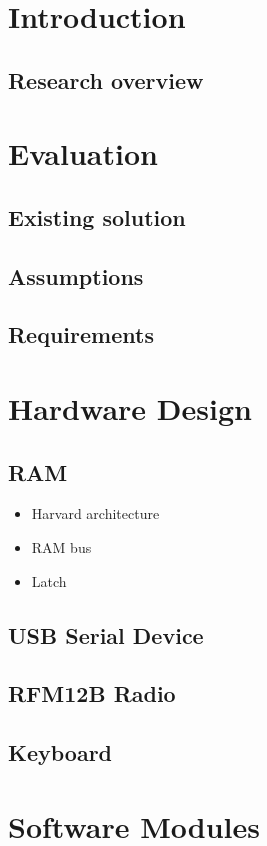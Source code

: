 \chapter{Introduction}
\section{Research overview}

\chapter{Evaluation}
\section{Existing solution}
\section{Assumptions}
\section{Requirements}

\chapter{Hardware Design}
\section{RAM}
\begin{itemize}
\item Harvard architecture
\item RAM bus
\item Latch
\end{itemize}
\section{USB Serial Device}
\section{RFM12B Radio}
\section{Keyboard}

\chapter{Software Modules}
